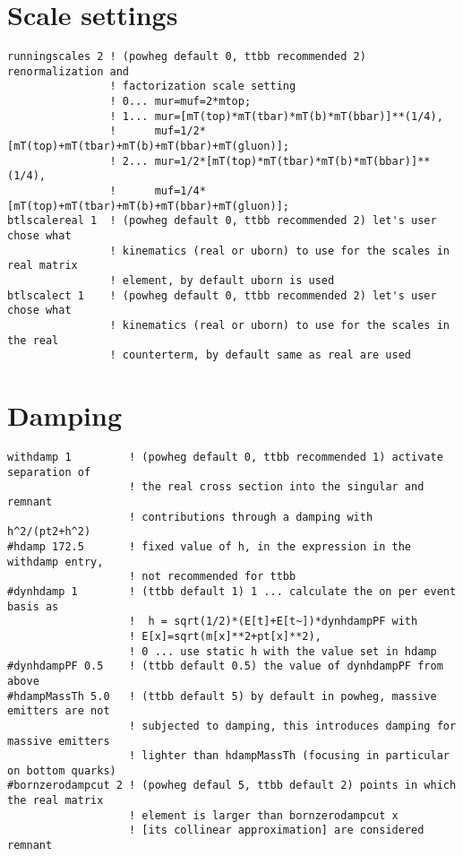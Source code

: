 \section{Scale settings}
\begin{lstlisting}[basicstyle=\ttfamily\scriptsize,frame = single]
runningscales 2 ! (powheg default 0, ttbb recommended 2) renormalization and 
                ! factorization scale setting
                ! 0... mur=muf=2*mtop; 
                ! 1... mur=[mT(top)*mT(tbar)*mT(b)*mT(bbar)]**(1/4), 
                !      muf=1/2*[mT(top)+mT(tbar)+mT(b)+mT(bbar)+mT(gluon)];
                ! 2... mur=1/2*[mT(top)*mT(tbar)*mT(b)*mT(bbar)]**(1/4), 
                !      muf=1/4*[mT(top)+mT(tbar)+mT(b)+mT(bbar)+mT(gluon)];
btlscalereal 1  ! (powheg default 0, ttbb recommended 2) let's user chose what  
                ! kinematics (real or uborn) to use for the scales in real matrix 
                ! element, by default uborn is used
btlscalect 1    ! (powheg default 0, ttbb recommended 2) let's user chose what
                ! kinematics (real or uborn) to use for the scales in the real
                ! counterterm, by default same as real are used

\end{lstlisting}
\section{Damping}
\begin{lstlisting}[basicstyle=\ttfamily\scriptsize,frame = single]
withdamp 1         ! (powheg default 0, ttbb recommended 1) activate separation of
                   ! the real cross section into the singular and remnant
                   ! contributions through a damping with h^2/(pt2+h^2)
#hdamp 172.5       ! fixed value of h, in the expression in the withdamp entry,
                   ! not recommended for ttbb
#dynhdamp 1        ! (ttbb default 1) 1 ... calculate the on per event  basis as
                   !  h = sqrt(1/2)*(E[t]+E[t~])*dynhdampPF with
                   ! E[x]=sqrt(m[x]**2+pt[x]**2), 
                   ! 0 ... use static h with the value set in hdamp
#dynhdampPF 0.5    ! (ttbb default 0.5) the value of dynhdampPF from above
#hdampMassTh 5.0   ! (ttbb default 5) by default in powheg, massive emitters are not
                   ! subjected to damping, this introduces damping for massive emitters
                   ! lighter than hdampMassTh (focusing in particular on bottom quarks)
#bornzerodampcut 2 ! (powheg defaul 5, ttbb default 2) points in which the real matrix
                   ! element is larger than bornzerodampcut x
                   ! [its collinear approximation] are considered remnant
\end{lstlisting}
